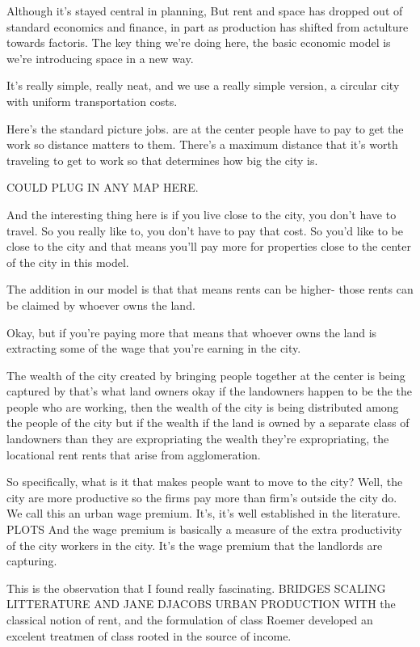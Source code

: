 Although it's stayed central in planning,
But rent and space has dropped out of standard economics and finance, in part as production has shifted from actulture towards factoris.
The key thing we're doing here, the basic economic model is we're introducing space in a new way.


It's really simple, really neat, and we use a really simple version, a circular city with uniform transportation costs.

Here's the standard picture jobs. are at the center people have to pay to get the work so distance matters to them. There's a maximum distance that it's worth traveling to get to work so that determines how big the city is.

COULD PLUG IN ANY MAP HERE. 

And the  interesting thing here is if you live close to the city, you don't have to travel. So you really like to, you don't have to pay that cost. So you'd like to be close to the city and that means you'll pay more for properties close to the center of the city in this model.

The addition in our model is that that means rents can be higher- those rents can be claimed by whoever owns the land.

Okay, but if you're paying more that means that whoever owns the land is extracting some of the wage that you're earning in the city.

The wealth of the city created by bringing people together at the center is being captured by that's what land owners okay if the landowners happen to be the the people who are working, then the wealth of the city is being distributed among the people of the city but if the wealth if the land is owned by a separate class of landowners than they are expropriating the wealth they're expropriating, the locational rent rents that arise from agglomeration.

So specifically, what is it that makes people want to move to the city? Well, the city are more productive so the firms pay more than  firm's outside the city do.  We call this an urban wage premium. It's, it's well established in the literature. PLOTS
And the wage premium is basically a measure of the extra productivity of the city workers in the city.
It's the wage premium that the landlords are capturing. 


This is the observation that I found really fascinating. 
BRIDGES SCALING LITTERATURE AND JANE DJACOBS URBAN PRODUCTION WITH the classical notion of rent, and the formulation of class Roemer developed an excelent treatmen of class rooted in the source of income. 


